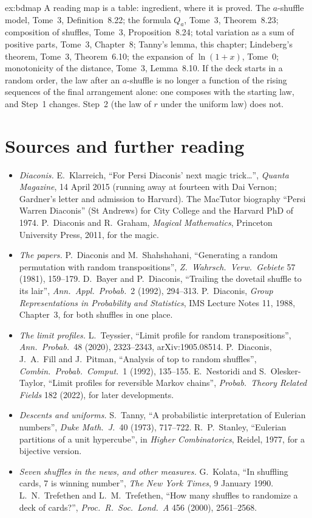 \begin{solution}{ex:bdmap}
\idea A reading map is a table: ingredient, where it is proved.
\writeup The $a$-shuffle model, Tome~3, Definition~8.22; the formula $Q_a$, Tome~3, Theorem~8.23; composition of shuffles, Tome~3, Proposition~8.24;
total variation as a sum of positive parts, Tome~3, Chapter~8; Tanny's lemma, this chapter; Lindeberg's theorem, Tome~3, Theorem~6.10; the expansion of $\ln(1+x)$, Tome~0;
monotonicity of the distance, Tome~3, Lemma~8.10. If the deck starts in a random order, the law after an $a$-shuffle is no longer a function of the rising sequences of
the final arrangement alone: one composes with the starting law, and Step~1 changes. Step~2 (the law of $r$ under the uniform law) does not.
\end{solution}

\section*{Sources and further reading}

\begin{itemize}
\item \emph{Diaconis.} E.~Klarreich, ``For Persi Diaconis' next magic trick\dots'', \emph{Quanta Magazine}, 14 April 2015 (running away at fourteen with Dai Vernon; Gardner's letter
and admission to Harvard). The MacTutor biography ``Persi Warren Diaconis'' (St Andrews) for City College and the Harvard PhD of 1974. P.~Diaconis and R.~Graham, \emph{Magical
Mathematics}, Princeton University Press, 2011, for the magic.
\item \emph{The papers.} P.~Diaconis and M.~Shahshahani, ``Generating a random permutation with random transpositions'', \emph{Z.\ Wahrsch.\ Verw.\ Gebiete} 57 (1981), 159--179.
D.~Bayer and P.~Diaconis, ``Trailing the dovetail shuffle to its lair'', \emph{Ann.\ Appl.\ Probab.}\ 2 (1992), 294--313. P.~Diaconis, \emph{Group Representations in Probability and
Statistics}, IMS Lecture Notes 11, 1988, Chapter~3, for both shuffles in one place.
\item \emph{The limit profiles.} L.~Teyssier, ``Limit profile for random transpositions'', \emph{Ann.\ Probab.}\ 48 (2020), 2323--2343, arXiv:1905.08514. P.~Diaconis, J.~A.~Fill and J.~Pitman,
``Analysis of top to random shuffles'', \emph{Combin.\ Probab.\ Comput.}\ 1 (1992), 135--155. E.~Nestoridi and S.~Olesker-Taylor, ``Limit profiles for reversible Markov chains'',
\emph{Probab.\ Theory Related Fields} 182 (2022), for later developments.
\item \emph{Descents and uniforms.} S.~Tanny, ``A probabilistic interpretation of Eulerian numbers'', \emph{Duke Math.\ J.}\ 40 (1973), 717--722. R.~P.~Stanley, ``Eulerian partitions of a unit
hypercube'', in \emph{Higher Combinatorics}, Reidel, 1977, for a bijective version.
\item \emph{Seven shuffles in the news, and other measures.} G.~Kolata, ``In shuffling cards, 7 is winning number'', \emph{The New York Times}, 9 January 1990. L.~N.~Trefethen and
L.~M.~Trefethen, ``How many shuffles to randomize a deck of cards?'', \emph{Proc.\ R.\ Soc.\ Lond.\ A} 456 (2000), 2561--2568.
\end{itemize}
